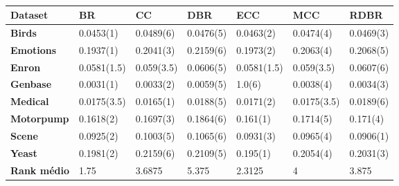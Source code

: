 \begin{table}[h]
\begin{tabular}{lllllll}
\hline
\textbf{Dataset}    & \textbf{BR} & \textbf{CC} & \textbf{DBR} & \textbf{ECC} & \textbf{MCC} & \textbf{RDBR} \\ \hline
\textbf{Birds}      & 0.0453(1)   & 0.0489(6)   & 0.0476(5)    & 0.0463(2)    & 0.0474(4)    & 0.0469(3)     \\
\textbf{Emotions}   & 0.1937(1)   & 0.2041(3)   & 0.2159(6)    & 0.1973(2)    & 0.2063(4)    & 0.2068(5)     \\
\textbf{Enron}      & 0.0581(1.5) & 0.059(3.5)  & 0.0606(5)    & 0.0581(1.5)  & 0.059(3.5)   & 0.0607(6)     \\
\textbf{Genbase}    & 0.0031(1)   & 0.0033(2)   & 0.0059(5)    & 1.0(6)       & 0.0038(4)    & 0.0034(3)     \\
\textbf{Medical}    & 0.0175(3.5) & 0.0165(1)   & 0.0188(5)    & 0.0171(2)    & 0.0175(3.5)  & 0.0189(6)     \\
\textbf{Motorpump}  & 0.1618(2)   & 0.1697(3)   & 0.1864(6)    & 0.161(1)     & 0.1714(5)    & 0.171(4)      \\
\textbf{Scene}      & 0.0925(2)   & 0.1003(5)   & 0.1065(6)    & 0.0931(3)    & 0.0965(4)    & 0.0906(1)     \\
\textbf{Yeast}      & 0.1981(2)   & 0.2159(6)   & 0.2109(5)    & 0.195(1)     & 0.2054(4)    & 0.2031(3)     \\ \hline
\textbf{Rank médio} & 1.75        & 3.6875      & 5.375        & 2.3125       & 4            & 3.875         \\ \hline
\end{tabular}
\caption{}
\label{tab:HLknn}
\end{table}